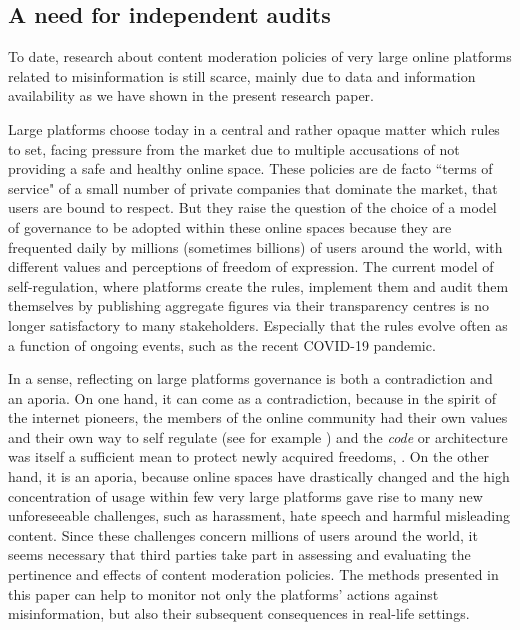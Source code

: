 \documentclass[Afour,sageh,times]{sagej}
\begin{document}
\subsection{A need for independent audits} 
To date, research about content moderation policies of very large online platforms related to misinformation is still scarce, mainly due to data and information availability as we have shown in the present research paper. 

Large platforms choose today in a central and rather opaque matter which rules to set, facing pressure from the market due to multiple accusations of not providing a safe and healthy online space. These policies are de facto ``terms of service" of a small number of private companies that dominate the market,  that users are bound to respect.
But they raise the question of the choice of a model of governance to be adopted within these online spaces because they are frequented daily by millions (sometimes billions) of users around the world, with different values and perceptions of freedom of expression. 
The current model of self-regulation, where platforms create the rules, implement them and audit them themselves by publishing aggregate figures via their transparency centres is no longer satisfactory to many stakeholders. 
Especially that the rules evolve often as a function of ongoing events, such as the recent COVID-19 pandemic.
 
In a sense, reflecting on large platforms governance is both a contradiction and an aporia. On one hand, it can come as a contradiction,  because in the spirit of the internet pioneers, the members of the online community had their own values and their own way to self regulate (see for example \cite{barlow}) and the {\it code} or architecture was itself a sufficient mean to protect newly acquired freedoms, \cite{lessigcode1}. On the other hand, it is an aporia, because online spaces have drastically changed  and the high concentration of usage within few very large platforms gave rise to many new unforeseeable challenges, such as harassment, hate speech and harmful misleading content. Since these challenges concern millions of users around the world, it seems necessary that third parties take part in assessing and evaluating the pertinence and effects of content moderation policies. The methods presented in this paper can help to monitor not only the platforms' actions against misinformation, but also their subsequent consequences in real-life settings.
\end{document}
